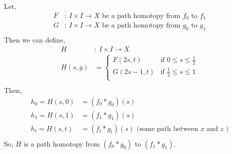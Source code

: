 \documentclass[../notes.tex]{subfiles}
\begin{document}
\begin{itemize}
            Let,
            \begin{align*}
                F&:\ I\times I\rightarrow X \text{ be a path homotopy from $f_0$ to $f_1$}\\
                G&:\ I\times I\rightarrow X \text{ be a path homotopy from $g_0$ to $g_1$}\\
            \end{align*}
            Then we can define,
            \begin{align*}
                H&:\ I\times I \rightarrow X\\
                H(s,y)&=\begin{cases}
                    F(2s,t) & \text{if } 0\leq s \leq \frac{1}{2}\\
                    G(2s-1,t) & \text{if } \frac{1}{2}\leq s \leq 1 \\
                \end{cases}\\
            \end{align*}
            Then,
            \begin{align*}
                h_0=H(s,0)&=(f_0*g_0)(s)\\
                h_1=H(s,1)&=(f_1*g_1)(s)\\
                h_t=H(s,t)&=(f_t*g_t)(s) \text{ (some path between $x$ and $z$ )}\\
            \end{align*}
            So, $H$ is a path homotopy from $(f_0*g_0)$ to $(f_1*g_1)$.
    \end{itemize}
\end{document}

